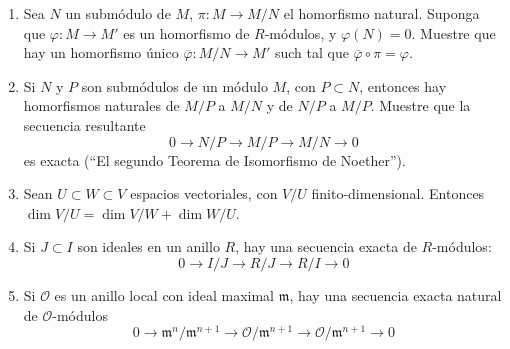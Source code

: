 \begin{prob}{2.49}
    \begin{enumerate}
        \item Sea \(N\) un submódulo de \(M\), \(\pi:M\rightarrow M/N\) el homorfismo natural. Suponga que \(\varphi:M\rightarrow M'\) es un homorfismo de \(R\)-módulos, y \(\varphi(N)=0\). Muestre que hay un homorfismo único \(\overline{\varphi}:M/N\rightarrow M'\) such tal que \(\overline{\varphi}\circ\pi=\varphi\).
        \item Si \(N\) y \(P\) son submódulos de un módulo \(M\), con \(P\subset N\), entonces hay homorfismos naturales de \(M/P\) a \(M/N\) y de \(N/P\) a \(M/P\). Muestre que la secuencia resultante
              \[
                  0\rightarrow N/P\rightarrow  M/P\rightarrow M/N\rightarrow 0
              \]
              es exacta (``El segundo Teorema de Isomorfismo de Noether'').
        \item Sean \(U\subset W\subset V\) espacios vectoriales, con \(V/U\) finito-dimensional. Entonces \(\dim V/U=\dim V/W+\dim W/U\).
        \item Si \(J\subset I\) son ideales en un anillo \(R\), hay una secuencia exacta de \(R\)-módulos:
              \[
                  0\rightarrow I/J\rightarrow R/J\rightarrow R/I\rightarrow 0
              \]
        \item Si \(\mathcal{O}\) es un anillo local con ideal maximal \(\mathfrak{m}\), hay una secuencia exacta natural de \(\mathcal{O}\)-módulos
              \[
                  0\rightarrow\mathfrak{m}^n/\mathfrak{m}^{n+1}\rightarrow\mathcal{O}/\mathfrak{m}^{n+1}\rightarrow\mathcal{O}/\mathfrak{m}^{n+1}\rightarrow 0
              \]
    \end{enumerate}
\end{prob}


